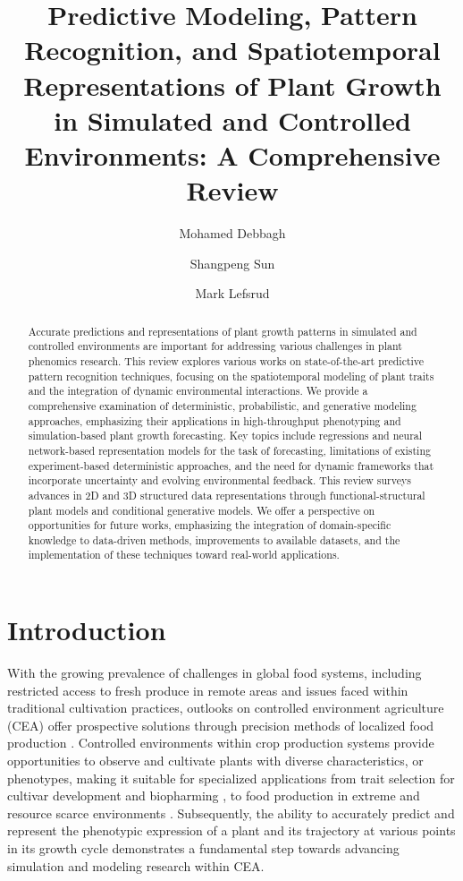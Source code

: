\documentclass{article}
\title{Predictive Modeling, Pattern Recognition, and Spatiotemporal Representations of Plant Growth in Simulated and Controlled Environments: A Comprehensive Review}
\author[1]{Mohamed Debbagh}
\author[1]{Shangpeng Sun}
\author[1]{Mark Lefsrud}
\affil[1]{Department of Bioresource Engineering, McGill University, Montr{\'e}al, Canada.}
\date{}
\begin{document}
\maketitle

\begin{abstract}
Accurate predictions and representations of plant growth patterns in simulated and controlled environments are important for addressing various challenges in plant phenomics research. This review explores various works on state-of-the-art predictive pattern recognition techniques, focusing on the spatiotemporal modeling of plant traits and the integration of dynamic environmental interactions. We provide a comprehensive examination of deterministic, probabilistic, and generative modeling approaches, emphasizing their applications in high-throughput phenotyping and simulation-based plant growth forecasting. Key topics include regressions and neural network-based representation models for the task of forecasting, limitations of existing experiment-based deterministic approaches, and the need for dynamic frameworks that incorporate uncertainty and evolving environmental feedback. This review surveys advances in 2D and 3D structured data representations through functional-structural plant models and conditional generative models. We offer a perspective on opportunities for future works, emphasizing the integration of domain-specific knowledge to data-driven methods, improvements to available datasets, and the implementation of these techniques toward real-world applications.
\end{abstract}



\section{Introduction}\label{introduction}
With the growing prevalence of challenges in global food systems, including restricted access to fresh produce in remote areas and issues faced within traditional cultivation practices, outlooks on controlled environment agriculture (CEA) offer prospective solutions through precision methods of localized food production \cite{Mirzabaev2023,OSULLIVAN2019133,KurtBenke10.1080/15487733.2017.1394054}. Controlled environments within crop production systems provide opportunities to observe and cultivate plants with diverse characteristics, or phenotypes, making it suitable for specialized applications from trait selection for cultivar development and biopharming \cite{Halperin/10.1111/tpj.13425,HENRY2020168,langstroff2022opportunities,agronomy13030858,YANG2023102267}, to food production in extreme and resource scarce environments \cite{NGUYEN2023708,10.3389/fpls.2020.00801,10.3389/fpls.2020.00656}. Subsequently, the ability to accurately predict and represent the phenotypic expression of a plant and its trajectory at various points in its growth cycle demonstrates a fundamental step towards advancing simulation and modeling research within CEA. 
\end{document}

